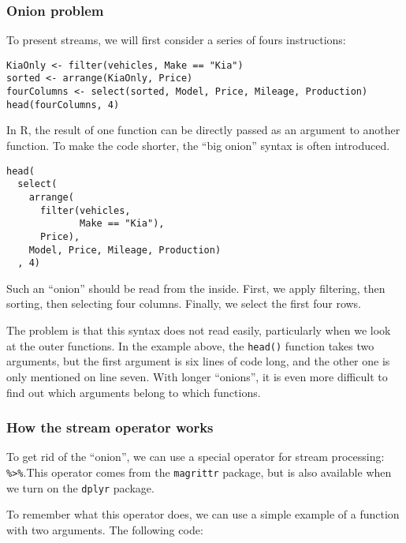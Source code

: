 \documentclass[]{book}
\theoremstyle{definition}
\theoremstyle{definition}
\theoremstyle{definition}
\theoremstyle{remark}
\begin{document}
\subsubsection*{Onion problem}\label{onion-problem}

To present streams, we will first consider a series of fours
instructions:

\begin{verbatim}
KiaOnly <- filter(vehicles, Make == "Kia")
sorted <- arrange(KiaOnly, Price)
fourColumns <- select(sorted, Model, Price, Mileage, Production)
head(fourColumns, 4)
\end{verbatim}

In R, the result of one function can be directly passed as an argument
to another function. To make the code shorter, the ``big onion'' syntax
is often introduced.

\begin{verbatim}
head(
  select(
    arrange(
      filter(vehicles,
             Make == "Kia"),
      Price),
    Model, Price, Mileage, Production)
  , 4)
\end{verbatim}

Such an ``onion'' should be read from the inside. First, we apply
filtering, then sorting, then selecting four columns. Finally, we select
the first four rows.

The problem is that this syntax does not read easily, particularly when
we look at the outer functions. In the example above, the
\texttt{head()} function takes two arguments, but the first argument is
six lines of code long, and the other one is only mentioned on line
seven. With longer ``onions'', it is even more difficult to find out
which arguments belong to which functions.

\subsubsection*{How the stream operator
works}\label{how-the-stream-operator-works}

To get rid of the ``onion'', we can use a special operator for stream
processing: \texttt{\%\textgreater{}\%}.This operator comes from the
\texttt{magrittr} package, but is also available when we turn on the
\texttt{dplyr} package.

To remember what this operator does, we can use a simple example of a
function with two arguments. The following code:
\end{document}

